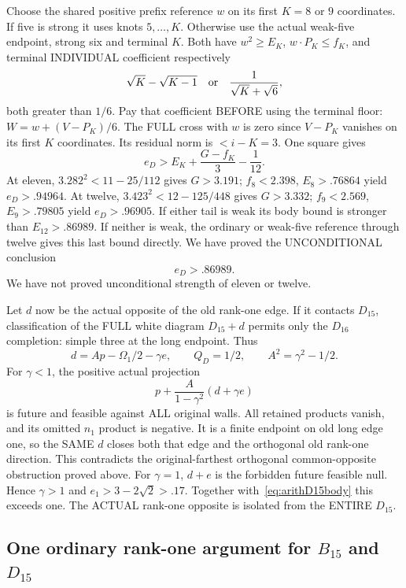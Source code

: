\documentclass[11pt]{article}
\begin{document}
Choose the shared positive prefix reference \(w\)
on its first \(K=8\) or \(9\) coordinates.
If five is strong it uses knots \(5,\ldots,K\).
Otherwise use the actual weak-five endpoint,
strong six and terminal \(K\).
Both have \(w^2\ge E_K\), \(w\cdot P_K\le f_K\),
and terminal INDIVIDUAL coefficient respectively
\[
 \sqrt K-\sqrt{K-1}\quad\hbox{or}\quad
 {\frac{1}{\sqrt K+\sqrt6}},
\]
both greater than \(1/6\).
Pay that coefficient BEFORE using the terminal floor:
\(W=w+(V-P_K)/6\).
The FULL cross with \(w\) is zero since \(V-P_K\)
vanishes on its first \(K\) coordinates.
Its residual norm is \(<i-K=3\).
One square gives
\[
                 e_D>E_K+{\frac{G-f_K}{3}}-{\frac{1}{12}}.
\]
At eleven,
\(3.282^2<11-25/112\) gives \(G>3.191\);
\(f_8<2.398\), \(E_8>.76864\) yield \(e_D>.94964\).
At twelve,
\(3.423^2<12-125/448\) gives \(G>3.332\);
\(f_9<2.569\), \(E_9>.79805\) yield \(e_D>.96905\).
If either tail is weak its body bound is stronger than
\(E_{12}>.86989\).
If neither is weak, the ordinary or weak-five reference
through twelve gives this last bound directly.
We have proved the UNCONDITIONAL conclusion
\[
                         e_D>.86989 .
\tag{R1D}\label{eq:arithD15body}
\]
We have not proved unconditional strength of eleven or twelve.

Let \(d\) now be the actual opposite of the old rank-one edge.
If it contacts \(D_{15}\), classification of the FULL
white diagram \(D_{15}+d\) permits only the \(D_{16}\)
completion: simple three at the long endpoint.
Thus
\[
 d=Ap-\Omega_1/2-\gamma e,\qquad
 Q_D=1/2,\qquad A^2=\gamma^2-1/2 .
\]
For \(\gamma<1\), the positive actual projection
\[
                  p+{\frac{A}{1-\gamma^2}}(d+\gamma e)
\]
is future and feasible against ALL original walls.
All retained products vanish, and its omitted \(n_1\)
product is negative.
It is a finite endpoint on old long edge one, so the
SAME \(d\) closes both that edge and the orthogonal
old rank-one direction.
This contradicts the original-farthest orthogonal
common-opposite obstruction proved above.
For \(\gamma=1\), \(d+e\) is the forbidden future
feasible null.
Hence \(\gamma>1\) and
\(e_1>3-2\sqrt2>.17\).
Together with~\eqref{eq:arithD15body} this exceeds one.
The ACTUAL rank-one opposite is isolated from the
ENTIRE \(D_{15}\).

\subsection[One ordinary rank-one argument for B15 and D15]{One ordinary rank-one argument for \(B_{15}\) and \(D_{15}\)}
\label{app:arithBD15ordinary}
\end{document}
